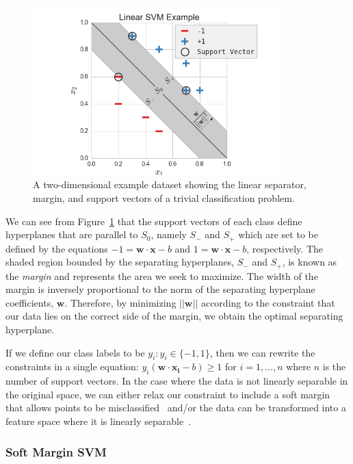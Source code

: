 \documentclass[12pt]{article}
\begin{document}
\begin{figure}[!ht]
  \centering
  \includegraphics[width=0.85\textwidth]{figs/chap3/svmExample}
  \caption[Linear Support Vector Machine Example]{A two-dimensional example
  dataset showing the linear separator, margin, and support vectors of a trivial
  classification problem.}
  \label{fig:svmExample}
\end{figure}

We can see from Figure~\ref{fig:svmExample} that the support vectors of each
class define hyperplanes that are parallel to $S_0$, namely $S_{-}$ and $S_{+}$
which are set to be defined by the equations $-1 = \mathbf{w} \cdot \mathbf{x} -
b$ and $1 = \mathbf{w} \cdot \mathbf{x} - b$, respectively.
%
The shaded region bounded by the separating hyperplanes, $S_{-}$ and $S_{+}$,
is known as the \emph{margin} and represents the area we seek to maximize.
%
The width of the margin is inversely proportional to the norm of the separating
hyperplane coefficients, $\mathbf{w}$.
%
Therefore, by minimizing $||\mathbf{w}||$ according to the constraint that our
data lies on the correct side of the margin, we obtain the optimal separating
hyperplane.

If we define our class labels to be $y_i: y_i \in \{-1,1\}$, then we can rewrite
the constraints in a single equation: $y_i(\mathbf{w} \cdot \mathbf{x_i} - b )
\geq 1$ for $i=1,...,n$ where $n$ is the number of support vectors.
%
In the case where the data is not linearly separable in the original space, we
can either relax our constraint to include a soft margin that allows points to
be misclassified~\cite{CortesVapnik1995} and/or the data can be transformed into
a feature space where it is linearly separable~\cite{BoserGuyonVapnik1992}.

\subsubsection{Soft Margin SVM}
\end{document}
